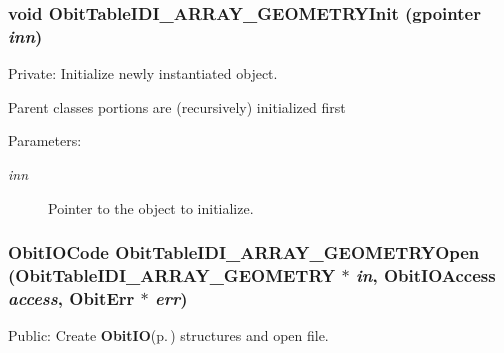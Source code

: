 \subsubsection{\setlength{\rightskip}{0pt plus 5cm}void Obit\-Table\-IDI\_\-ARRAY\_\-GEOMETRYInit (gpointer {\em inn})}\label{ObitTableIDI__ARRAY__GEOMETRY_8c_a8}


Private: Initialize newly instantiated object. 

Parent classes portions are (recursively) initialized first \begin{Desc}
\item[Parameters:]
\begin{description}
\item[{\em inn}]Pointer to the object to initialize. \end{description}
\end{Desc}
\subsubsection{\setlength{\rightskip}{0pt plus 5cm}Obit\-IOCode Obit\-Table\-IDI\_\-ARRAY\_\-GEOMETRYOpen ({\bf Obit\-Table\-IDI\_\-ARRAY\_\-GEOMETRY} $\ast$ {\em in}, Obit\-IOAccess {\em access}, {\bf Obit\-Err} $\ast$ {\em err})}\label{ObitTableIDI__ARRAY__GEOMETRY_8c_a21}


Public: Create {\bf Obit\-IO}{\rm (p.\,\pageref{structObitIO})} structures and open file. 

